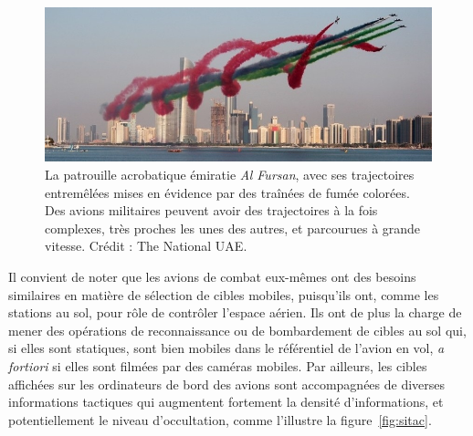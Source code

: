 	
	\begin{figure}[!htbp]
		\centering
		\includegraphics[width=\textwidth]{figures/ch1/AlFursan}
		\caption[La patrouille acrobatique \emph{Al Fursan}]{La patrouille acrobatique émiratie \emph{Al Fursan}, avec ses trajectoires entremêlées mises en évidence par des traînées de fumée colorées. Des avions militaires peuvent avoir des trajectoires à la fois complexes, très proches les unes des autres, et parcourues à grande vitesse. Crédit : The National UAE\footnotemark.}
		\label{fig:alfursan}
	\end{figure}
	
	
	Il convient de noter que les avions de combat eux-mêmes ont des besoins similaires en matière de sélection de cibles mobiles, puisqu'ils ont, comme les stations au sol, pour rôle de contrôler l'espace aérien. Ils ont de plus la charge de mener des opérations de reconnaissance ou de bombardement de cibles au sol qui, si elles sont statiques, sont bien mobiles dans le référentiel de l'avion en vol, \emph{a fortiori} si elles sont filmées par des caméras mobiles. Par ailleurs, les cibles affichées sur les ordinateurs de bord des avions sont accompagnées de diverses informations tactiques qui augmentent fortement la densité d'informations, et potentiellement le niveau d'occultation, comme l'illustre la figure~\ref{fig:sitac}.
	
